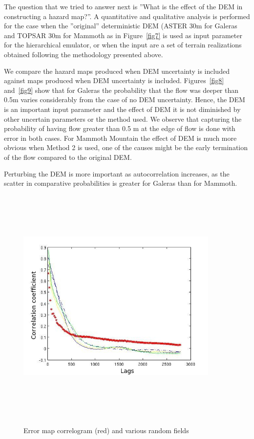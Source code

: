 \documentclass{article}
\newcommand{\Pic}[2][0.85]{\begin{center}\texttt{[image: \#2]}
 \end{center} }
\begin{document}
The question that we tried to answer next is ''What is the effect of
the DEM in constructing a hazard map?''.  A quantitative and
qualitative analysis is performed for the case when the ''original''
deterministic DEM (ASTER 30m for Galeras and TOPSAR 30m for Mammoth as
in Figure~\ref{fig7} is used as input parameter for the hierarchical
emulator, or when the input are a set of terrain realizations obtained
following the methodology presented above.

We compare the hazard maps produced when DEM uncertainty is included
against maps produced when DEM uncertainty is included.
Figures~\ref{fig8} and~\ref{fig9} show that for Galeras the
probability that the flow was deeper than 0.5m varies considerably
from the case of no DEM uncertainty. Hence, the DEM is an important
input parameter and the effect of DEM it is not diminished by other
uncertain parameters or the method used. We observe that capturing the
probability of having flow greater than 0.5 m at the edge of flow is
done with error in both cases. For Mammoth Mountain the effect of DEM
is much more obvious when Method 2 is used, one of the causes might be
the early termination of the flow compared to the original DEM.

Perturbing the DEM is more important as autocorrelation increases, as
the scatter in comparative probabilities is greater for Galeras than
for Mammoth.

	
%	
		

\begin{figure}[H]
\centering
	\includegraphics[width=10cm,height=12cm,keepaspectratio]{figs/mammoth_error_correl.jpg}\\       
\caption{ Error map correlogram (red) and various random fields}
\label{fig1}  
\end{figure}
\end{document}
